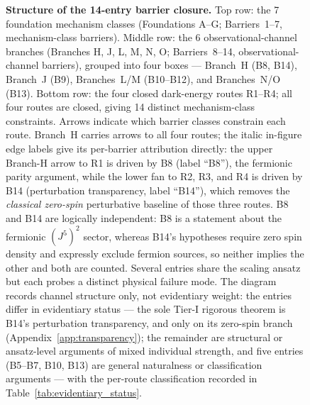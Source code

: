 \documentclass[aps,prd,twocolumn,superscriptaddress,showpacs,preprintnumbers,nofootinbib,longbibliography,floatfix]{revtex4-2}
\begin{document}
\begin{figure}[t]
\begin{tikzpicture}
\end{tikzpicture}
\caption{\textbf{Structure of the 14-entry barrier closure.} Top row: the
7 foundation mechanism classes (Foundations A--G; Barriers~1--7,
mechanism-class barriers). Middle row: the 6 observational-channel
branches (Branches H, J, L, M, N, O; Barriers~8--14,
observational-channel barriers), grouped into four boxes --- Branch~H
(B8, B14), Branch~J (B9), Branches~L/M (B10--B12), and Branches~N/O
(B13). Bottom row: the four closed dark-energy routes R1--R4; all four
routes are closed, giving 14 distinct mechanism-class constraints. Arrows
indicate which barrier classes constrain each route. Branch~H carries
arrows to all four routes; the italic in-figure edge labels give its
per-barrier attribution directly: the upper Branch-H arrow to R1 is
driven by B8 (label ``B8''), the fermionic parity argument, while the
lower fan to R2, R3, and R4 is driven by B14 (perturbation transparency,
label ``B14''), which removes the \emph{classical zero-spin} perturbative
baseline of those three routes. B8 and B14 are logically independent:
B8 is a statement about the fermionic $(J^5)^2$ sector, whereas B14's
hypotheses require zero spin density and expressly exclude fermion
sources, so neither implies the other and both are counted.
Several entries share the scaling ansatz but each probes a distinct
physical failure mode. The diagram records channel structure only, not
evidentiary weight: the entries differ in evidentiary status --- the
sole Tier-I rigorous theorem is B14's perturbation transparency, and
only on its zero-spin branch
(Appendix~\ref{app:transparency}); the remainder are structural or
ansatz-level arguments of mixed individual strength, and five entries
(B5--B7, B10, B13) are general naturalness or classification arguments
--- with the per-route classification recorded in
Table~\ref{tab:evidentiary_status}.
\label{fig:barrier_map}}
\end{figure}
\end{document}
